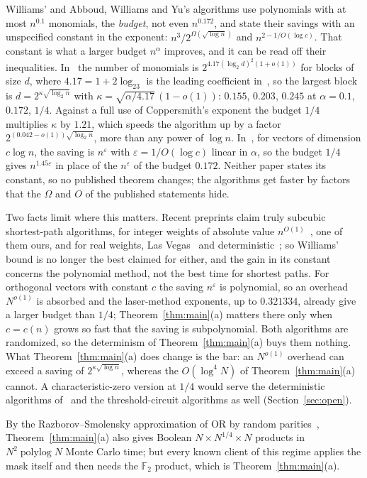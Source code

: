 \documentclass[11pt]{article}
\theoremstyle{definition}
\theoremstyle{remark}
\newcommand{\F}{\mathbb{F}}
\newcommand{\eps}{\varepsilon}
\DeclareMathOperator{\polylog}{polylog}
\begin{document}
Williams' and Abboud, Williams and Yu's algorithms use polynomials with at most $n^{0.1}$ monomials, the \emph{budget}, not even $n^{0.172}$, and state their savings with an unspecified constant in the exponent: $n^3/2^{\Omega(\sqrt{\log n})}$ and $n^{2-1/O(\log c)}$. That constant is what a larger budget $n^\alpha$ improves, and it can be read off their inequalities. In~\cite{Wil14a} the number of monomials is $2^{4.17(\log_2d)^2(1+o(1))}$ for blocks of size $d$, where $4.17=1+2\log_23$ is the leading coefficient in~\cite[inequality~(2)]{Wil14a}, so the largest block is $d=2^{\kappa\sqrt{\log_2n}}$ with $\kappa=\sqrt{\alpha/4.17}\,(1-o(1))$: $0.155$, $0.203$, $0.245$ at $\alpha=0.1$, $0.172$, $1/4$. Against a full use of Coppersmith's exponent the budget $1/4$ multiplies $\kappa$ by $1.21$, which speeds the algorithm up by a factor $2^{(0.042-o(1))\sqrt{\log_2n}}$, more than any power of $\log n$. In~\cite{AWY15}, for vectors of dimension $c\log n$, the saving is $n^\eps$ with $\eps=1/O(\log c)$ linear in $\alpha$, so the budget $1/4$ gives $n^{1.45\eps}$ in place of the $n^\eps$ of the budget $0.172$. Neither paper states its constant, so no published theorem changes; the algorithms get faster by factors that the $\Omega$ and $O$ of the published statements hide.

Two facts limit where this matters. Recent preprints claim truly subcubic shortest-path algorithms, for integer weights of absolute value $n^{O(1)}$~\cite{AV26,Maj26}, one of them ours, and for real weights, Las Vegas~\cite[Theorem~35]{AV26} and deterministic~\cite{CIMY26,EZ26}; so Williams' bound is no longer the best claimed for either, and the gain in its constant concerns the polynomial method, not the best time for shortest paths. For orthogonal vectors with constant $c$ the saving $n^\eps$ is polynomial, so an overhead $N^{o(1)}$ is absorbed and the laser-method exponents, up to $0.321334$, already give a larger budget than $1/4$; Theorem~\ref{thm:main}(a) matters there only when $c=c(n)$ grows so fast that the saving is subpolynomial. Both algorithms are randomized, so the determinism of Theorem~\ref{thm:main}(a) buys them nothing. What Theorem~\ref{thm:main}(a) does change is the bar: an $N^{o(1)}$ overhead can exceed a saving of $2^{\kappa\sqrt{\log n}}$, whereas the $O(\log^4N)$ of Theorem~\ref{thm:main}(a) cannot. A characteristic-zero version at $1/4$ would serve the deterministic algorithms of~\cite{CW16} and the threshold-circuit algorithms as well (Section~\ref{sec:open}).

By the Razborov--Smolensky approximation of OR by random parities~\cite{Raz87,Smo87}, Theorem~\ref{thm:main}(a) also gives Boolean $N\times N^{1/4}\times N$ products in $N^2\polylog N$ Monte Carlo time; but every known client of this regime applies the mask itself and then needs the $\F_2$ product, which is Theorem~\ref{thm:main}(a).
\end{document}
